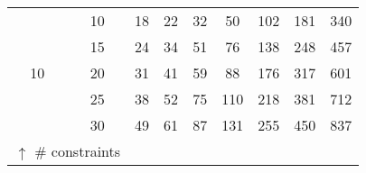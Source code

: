\begin{table}[]
{\begin{tabular}{|c|c|ccccccc|}
\multirow{5}{*}{10}&10                                                           & 18 & 22 & 32 & 50 & 102 & 181 & 340  \\
&15                                                           & 24 & 34 & 51 & 76 & 138 & 248 & 457  \\
&20                                                           & 31 & 41 & 59 & 88 & 176 & 317 & 601  \\
&25                                                           & 38 & 52 & 75 & 110 & 218 & 381 & 712  \\
&30                                                           & 49 & 61 & 87 & 131 & 255 & 450 & 837  \\
\hline 
\hline
\multicolumn{2}{|c}{ $\uparrow$ \# constraints}  &  &  &  &  &  &  &   \\
\hline 

\end{tabular}
}
\end{table}

